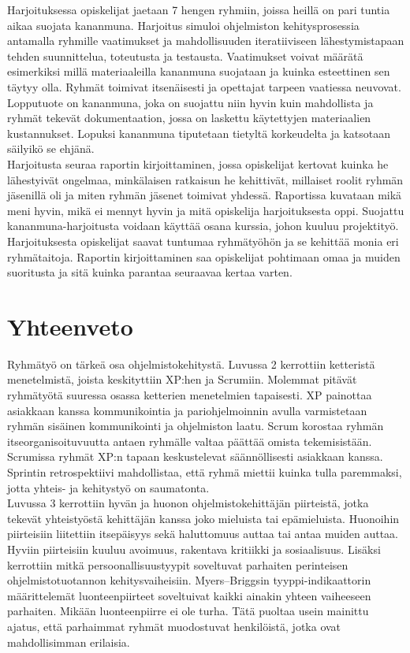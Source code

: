\documentclass[finnish]{../tktltiki2}
\theoremstyle{definition}
\theoremstyle{remark}
\begin{document}
\begin{itemize}
Harjoituksessa opiskelijat jaetaan 7 hengen ryhmiin, joissa heillä on pari tuntia aikaa suojata kananmuna. Harjoitus simuloi ohjelmiston kehitysprosessia antamalla ryhmille vaatimukset ja mahdollisuuden iteratiiviseen lähestymistapaan tehden suunnittelua, toteutusta ja testausta. Vaatimukset voivat määrätä esimerkiksi millä materiaaleilla kananmuna suojataan ja kuinka esteettinen sen täytyy olla. Ryhmät toimivat itsenäisesti ja opettajat tarpeen vaatiessa neuvovat. Lopputuote on kananmuna, joka on suojattu niin hyvin kuin mahdollista ja ryhmät tekevät dokumentaation, jossa on laskettu käytettyjen materiaalien kustannukset. Lopuksi kananmuna tiputetaan tietyltä korkeudelta ja katsotaan säilyikö se ehjänä.\\

Harjoitusta seuraa raportin kirjoittaminen, jossa opiskelijat kertovat kuinka he lähestyivät ongelmaa, minkälaisen ratkaisun he kehittivät, millaiset roolit ryhmän jäsenillä oli ja miten ryhmän jäsenet toimivat yhdessä. Raportissa kuvataan mikä meni hyvin, mikä ei mennyt hyvin ja mitä opiskelija harjoituksesta oppi. Suojattu kananmuna-harjoitusta voidaan käyttää osana kurssia, johon kuuluu projektityö. Harjoituksesta opiskelijat saavat tuntumaa ryhmätyöhön ja se kehittää monia eri ryhmätaitoja. Raportin kirjoittaminen saa opiskelijat pohtimaan omaa ja muiden suoritusta ja sitä kuinka parantaa seuraavaa kertaa varten.

\end{itemize}

\section{Yhteenveto}

\enlargethispage{\baselineskip}

Ryhmätyö on tärkeä osa ohjelmistokehitystä. Luvussa 2 kerrottiin ketteristä menetelmistä, joista keskityttiin XP:hen ja Scrumiin. Molemmat pitävät ryhmätyötä suuressa osassa ketterien menetelmien tapaisesti. XP painottaa asiakkaan kanssa kommunikointia ja pariohjelmoinnin avulla varmistetaan ryhmän sisäinen kommunikointi ja ohjelmiston laatu. Scrum korostaa ryhmän itseorganisoituvuutta antaen ryhmälle valtaa päättää omista tekemisistään. Scrumissa ryhmät XP:n tapaan keskustelevat säännöllisesti asiakkaan kanssa. Sprintin retrospektiivi mahdollistaa, että ryhmä miettii kuinka tulla paremmaksi, jotta yhteis- ja kehitystyö on saumatonta.\\

Luvussa 3 kerrottiin hyvän ja huonon ohjelmistokehittäjän piirteistä, jotka tekevät yhteistyöstä kehittäjän kanssa joko mieluista tai epämieluista. Huonoihin piirteisiin liitettiin itsepäisyys sekä haluttomuus auttaa tai antaa muiden auttaa. Hyviin piirteisiin kuuluu avoimuus, rakentava kritiikki ja sosiaalisuus. Lisäksi kerrottiin mitkä persoonallisuustyypit soveltuvat parhaiten perinteisen ohjelmistotuotannon kehitysvaiheisiin. Myers--Briggsin tyyppi-indikaattorin määrittelemät luonteenpiirteet soveltuivat kaikki ainakin yhteen vaiheeseen parhaiten. Mikään luonteenpiirre ei ole turha. Tätä puoltaa usein mainittu ajatus, että parhaimmat ryhmät muodostuvat henkilöistä, jotka ovat mahdollisimman erilaisia.\\
\end{document}
